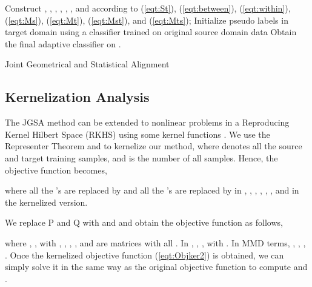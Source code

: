 \documentclass[10pt,twocolumn,letterpaper]{article}
\begin{document}
\begin{algorithm}
\begin{small}

    Construct , , , , , , and  according to (\ref{eqt:St}), (\ref{eqt:between}), (\ref{eqt:within}), (\ref{eqt:Ms}), (\ref{eqt:Mt}), (\ref{eqt:Mst}), and (\ref{eqt:Mts}); Initialize pseudo labels in target domain  using a classifier trained on original source domain data\;
    Obtain the final adaptive classifier  on .
    \caption{\small Joint Geometrical and Statistical Alignment}
    \label{alg:GSA}
\end{small}
\end{algorithm}

\subsection{Kernelization Analysis}
The JGSA method can be extended to nonlinear problems in a Reproducing Kernel Hilbert Space (RKHS) using some kernel functions . 
We use the Representer Theorem  and  to kernelize our method, where  denotes all the source and target training samples,  and  is the number of all samples. 
Hence, the objective function becomes,

\begin{footnotesize}

\end{footnotesize}
where all the 's are replaced by  and all the 's are replaced by  in , , , , , , and  in the kernelized version.

We replace P and Q with  and  and obtain the objective function as follows,

\begin{footnotesize}

\end{footnotesize}
where , , with , , , ,  and  are matrices with all .
In , , , with . 
In MMD terms,
,
, 
,
.
Once the kernelized objective function (\ref{eqt:Objker2}) is obtained, we can simply solve it in the same way as the original objective function to compute  and . 
\end{document}
